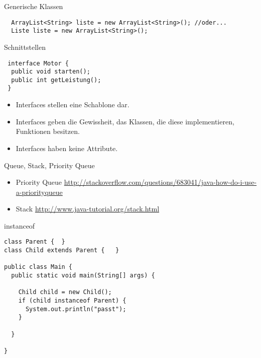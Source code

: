 \documentclass[18pt]{beamer}
\begin{document}
\begin{frame}[fragile]{Generische Klassen}
 \begin{lstlisting}
  ArrayList<String> liste = new ArrayList<String>(); //oder...
  Liste liste = new ArrayList<String>();
 \end{lstlisting}
\end{frame}


\begin{frame}[fragile]{Schnittstellen}
\begin{lstlisting}
 interface Motor {
  public void starten();
  public int getLeistung();
 }
 \end{lstlisting}
 \begin{itemize}
  \item Interfaces stellen eine Schablone dar.
  \item Interfaces geben die Gewissheit, das Klassen, die diese implementieren, Funktionen besitzen.
  \item Interfaces haben keine Attribute.
 \end{itemize}

\end{frame}



\begin{frame}{Queue, Stack, Priority Queue}
\begin{itemize}
 \item Priority Queue \url{http://stackoverflow.com/questions/683041/java-how-do-i-use-a-priorityqueue}
 \item Stack \url{http://www.java-tutorial.org/stack.html}
\end{itemize}

 
\end{frame}

\begin{frame}[fragile]{instanceof}
 \begin{lstlisting}
class Parent {  }
class Child extends Parent {   }

public class Main {
  public static void main(String[] args) {

    Child child = new Child();
    if (child instanceof Parent) {
      System.out.println("passt");
    }

  }

}
 \end{lstlisting}

\end{frame}
\end{document}
